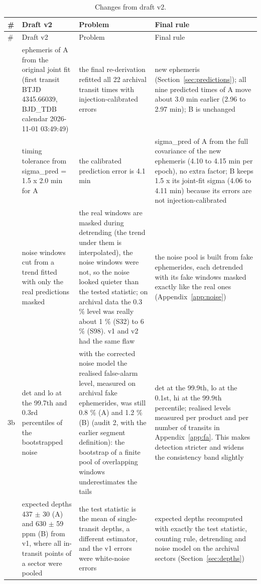 \begingroup\footnotesize
\begin{longtable}{>{\raggedright\arraybackslash}p{}>{\raggedright\arraybackslash}p{}>{\raggedright\arraybackslash}p{}>{\raggedright\arraybackslash}p{}}
\caption{Changes from draft v2.\label{tab:history}}\\
\toprule
\# & Draft v2 & Problem & Final rule \\
\midrule
\endfirsthead
\toprule
\# & Draft v2 & Problem & Final rule \\
\midrule
\endhead
1 & ephemeris of A from the original joint fit (first transit BTJD 4345.66039, BJD\_TDB calendar 2026-11-01 03:49:49) & the final re-derivation refitted all 22 archival transit times with injection-calibrated errors & new ephemeris (Section~\ref{sec:predictions}); all nine predicted times of A move about 3.0 min earlier (2.96 to 2.97 min); B is unchanged \\
2 & timing tolerance from sigma\_pred = 1.5 x 2.0 min for A & the calibrated prediction error is 4.1 min & sigma\_pred of A from the full covariance of the new ephemeris (4.10 to 4.15 min per epoch), no extra factor; B keeps 1.5 x its joint-fit sigma (4.06 to 4.11 min) because its errors are not injection-calibrated \\
3 & noise windows cut from a trend fitted with only the real predictions masked & the real windows are masked during detrending (the trend under them is interpolated), the noise windows were not, so the noise looked quieter than the tested statistic; on archival data the 0.3 \% level was really about 1 \% (S32) to 6 \% (S98). v1 and v2 had the same flaw & the noise pool is built from fake ephemerides, each detrended with its fake windows masked exactly like the real ones (Appendix~\ref{app:noise}) \\
3b & det and lo at the 99.7th and 0.3rd percentiles of the bootstrapped noise & with the corrected noise model the realised false-alarm level, measured on archival fake ephemerides, was still 0.8 \% (A) and 1.2 \% (B) (audit 2, with the earlier segment definition): the bootstrap of a finite pool of overlapping windows underestimates the tails & det at the 99.9th, lo at the 0.1st, hi at the 99.9th percentile; realised levels measured per product and per number of transits in Appendix~\ref{app:fa}. This makes detection stricter and widens the consistency band slightly \\
4 & expected depths 437 $\pm$ 30 (A) and 630 $\pm$ 59 ppm (B) from v1, where all in-transit points of a sector were pooled & the test statistic is the mean of single-transit depths, a different estimator, and the v1 errors were white-noise errors & expected depths recomputed with exactly the test statistic, counting rule, detrending and noise model on the archival sectors (Section~\ref{sec:depths}) \\

\end{longtable}
